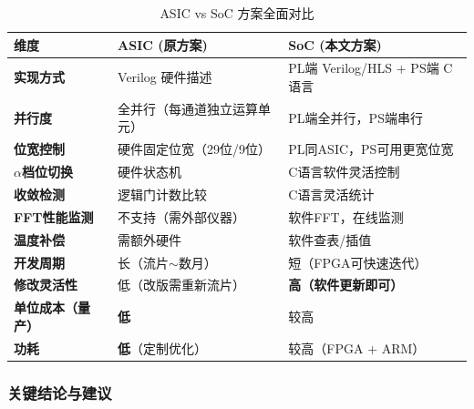 \documentclass[UTF8,a4paper,11pt]{ctexart}
\begin{document}
\begin{table}[ht]
\centering
\caption{ASIC vs SoC 方案全面对比}
\begin{tabular}{p{2.8cm}p{3.5cm}p{4cm}}
\toprule
\textbf{维度} & \textbf{ASIC (原方案)} & \textbf{SoC (本文方案)} \\
\midrule
\textbf{实现方式} & Verilog 硬件描述 & PL端 Verilog/HLS + PS端 C语言 \\
\textbf{并行度} & 全并行（每通道独立运算单元） & PL端全并行，PS端串行 \\
\textbf{位宽控制} & 硬件固定位宽（29位/9位） & PL同ASIC，PS可用更宽位宽 \\
\textbf{$\alpha$档位切换} & 硬件状态机 & C语言软件灵活控制 \\
\textbf{收敛检测} & 逻辑门计数比较 & C语言灵活统计 \\
\textbf{FFT性能监测} & 不支持（需外部仪器） & 软件FFT，在线监测 \\
\textbf{温度补偿} & 需额外硬件 & 软件查表/插值 \\
\textbf{开发周期} & 长（流片$\sim$数月） & 短（FPGA可快速迭代） \\
\textbf{修改灵活性} & 低（改版需重新流片） & \textbf{高（软件更新即可）} \\
\textbf{单位成本（量产）} & \textbf{低} & 较高 \\
\textbf{功耗} & \textbf{低}（定制优化） & 较高（FPGA + ARM） \\
\bottomrule
\end{tabular}
\end{table}

\subsubsection{关键结论与建议}
\end{document}
